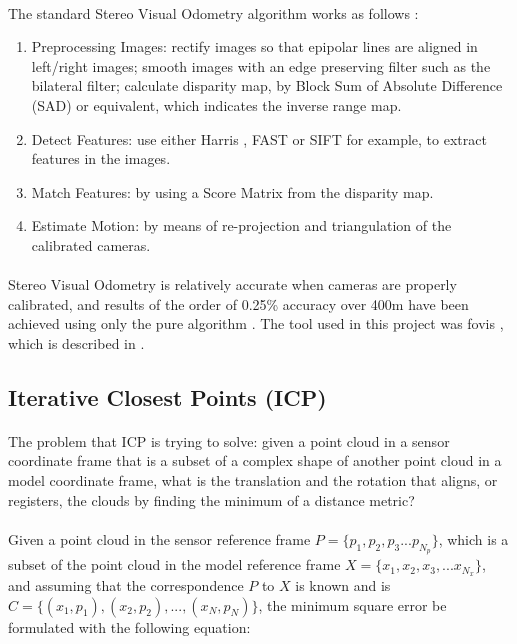 \documentclass[12pt]{article}
\begin{document}
	\paragraph{}
	The standard Stereo Visual Odometry algorithm works as follows \cite{StereoVis1}:
	\begin{enumerate}[leftmargin=.8in]
	\item Preprocessing Images: rectify images so that epipolar lines are aligned in left/right images; smooth images with an edge preserving filter such as the bilateral filter; calculate disparity map, by Block Sum of Absolute Difference (SAD) or equivalent, which indicates the inverse range map.
	\item Detect Features: use either Harris \cite{Harris}, FAST \cite{FAST} or  SIFT \cite{SIFT} for example, to extract features in the images.
	\item Match Features: by using a Score Matrix from the disparity map.
	\item Estimate Motion: by means of re-projection and triangulation of the calibrated cameras.
	\end{enumerate}
	
	\paragraph{}
	Stereo Visual Odometry is relatively accurate when cameras are properly calibrated, and results of the order of 0.25\% accuracy over 400m have been achieved using only the pure algorithm \cite{StereoVis1}. The tool used in this project was fovis \cite{fovis}, which is described in \cite{VisualOdometry}.
	
	\subsection{Iterative Closest Points (ICP)}
	\paragraph{}
	The problem that ICP is trying to solve: given a point cloud in a sensor coordinate frame that is a subset of a complex shape of another point cloud in a model coordinate frame, what is the translation and the rotation that aligns, or registers, the clouds by finding the minimum of a distance metric?
	
	\paragraph{}
	Given a point cloud in the sensor reference frame $P = \{p_1, p_2, p_3 ... p_{N_p}\}$, which is a subset of the point cloud in the model reference frame $X = \{x_1, x_2, x_3, ... x_{N_x}\}$, and assuming that the correspondence $P$ to $X$ is known and is $C = \{(x_1,p_1), (x_2,p_2), ... , (x_N, p_N)\}$, the minimum square error be formulated with the following equation:
	
\end{document}
